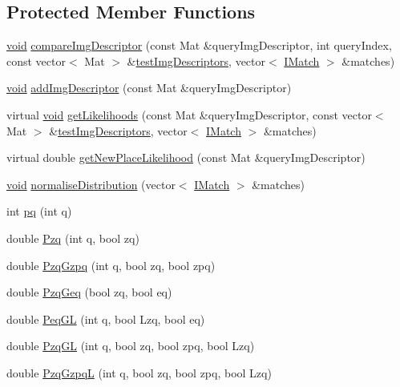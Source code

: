 \subsection*{Protected Member Functions}
\begin{DoxyCompactItemize}
\item 
\hyperlink{legacy_8hpp_a8bb47f092d473522721002c86c13b94e}{void} \hyperlink{classcv_1_1of2_1_1FabMap_ad61ab354d779347f79703af20113d607}{compare\-Img\-Descriptor} (const Mat \&query\-Img\-Descriptor, int query\-Index, const vector$<$ Mat $>$ \&\hyperlink{classcv_1_1of2_1_1FabMap_a46f350e86965ec1e00ae4bd629dd4c8d}{test\-Img\-Descriptors}, vector$<$ \hyperlink{structcv_1_1of2_1_1IMatch}{I\-Match} $>$ \&matches)
\item 
\hyperlink{legacy_8hpp_a8bb47f092d473522721002c86c13b94e}{void} \hyperlink{classcv_1_1of2_1_1FabMap_af29c1aceade2ce8e7f05bd8e206689dd}{add\-Img\-Descriptor} (const Mat \&query\-Img\-Descriptor)
\item 
virtual \hyperlink{legacy_8hpp_a8bb47f092d473522721002c86c13b94e}{void} \hyperlink{classcv_1_1of2_1_1FabMap_a6f1b98734a139b0a076d89d55d83175e}{get\-Likelihoods} (const Mat \&query\-Img\-Descriptor, const vector$<$ Mat $>$ \&\hyperlink{classcv_1_1of2_1_1FabMap_a46f350e86965ec1e00ae4bd629dd4c8d}{test\-Img\-Descriptors}, vector$<$ \hyperlink{structcv_1_1of2_1_1IMatch}{I\-Match} $>$ \&matches)
\item 
virtual double \hyperlink{classcv_1_1of2_1_1FabMap_afe56c71b70a232bf198050b122ca53b2}{get\-New\-Place\-Likelihood} (const Mat \&query\-Img\-Descriptor)
\item 
\hyperlink{legacy_8hpp_a8bb47f092d473522721002c86c13b94e}{void} \hyperlink{classcv_1_1of2_1_1FabMap_a8f8d94fb93b3154d14328872903d2fa3}{normalise\-Distribution} (vector$<$ \hyperlink{structcv_1_1of2_1_1IMatch}{I\-Match} $>$ \&matches)
\item 
int \hyperlink{classcv_1_1of2_1_1FabMap_afb1fa3847a0b20cb494a13572e32ffb2}{pq} (int q)
\item 
double \hyperlink{classcv_1_1of2_1_1FabMap_ae0b0c60dd878c1bf596e271219c284f2}{Pzq} (int q, bool zq)
\item 
double \hyperlink{classcv_1_1of2_1_1FabMap_a46297257c0db808fe74152d82390a7b2}{Pzq\-Gzpq} (int q, bool zq, bool zpq)
\item 
double \hyperlink{classcv_1_1of2_1_1FabMap_aea405a7198637f73bf44b7e0a01eec6b}{Pzq\-Geq} (bool zq, bool eq)
\item 
double \hyperlink{classcv_1_1of2_1_1FabMap_abf18cc11efedaeaf90b18f4300a36538}{Peq\-G\-L} (int q, bool Lzq, bool eq)
\item 
double \hyperlink{classcv_1_1of2_1_1FabMap_abf8b33662306bb1cc953fe41f0fa2e03}{Pzq\-G\-L} (int q, bool zq, bool zpq, bool Lzq)
\item 
double \hyperlink{classcv_1_1of2_1_1FabMap_a107c45b78bd224f9ce6d4eea39fba0ba}{Pzq\-Gzpq\-L} (int q, bool zq, bool zpq, bool Lzq)
\end{DoxyCompactItemize}
